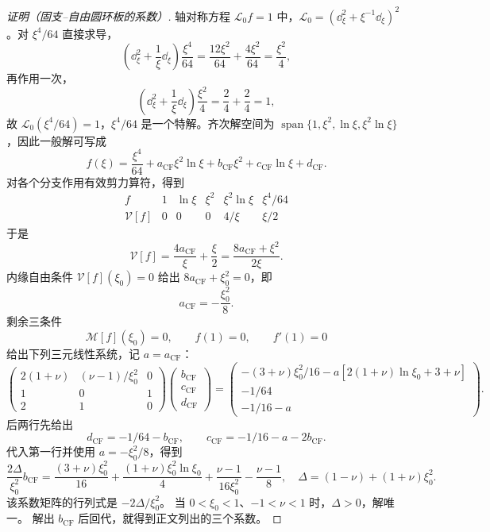 \begin{proof}[证明（固支--自由圆环板的系数）]
轴对称方程 \(\mathcal L_0 f=1\) 中，\(\mathcal L_0=(\dd_\xi^2+\xi^{-1}\dd_\xi)^2\)。对 \(\xi^4/64\) 直接求导，
\[
 \left(\dd_\xi^2+\frac1\xi\dd_\xi\right)\frac{\xi^4}{64}
 =\frac{12\xi^2}{64}+\frac{4\xi^2}{64}
 =\frac{\xi^2}{4},
\]
再作用一次，
\[
 \left(\dd_\xi^2+\frac1\xi\dd_\xi\right)\frac{\xi^2}{4}
 =\frac{2}{4}+\frac{2}{4}
 =1,
\]
故 \(\mathcal L_0(\xi^4/64)=1\)，\(\xi^4/64\) 是一个特解。齐次解空间为 \(\operatorname{span}\{1,\xi^2,\ln\xi,\xi^2\ln\xi\}\)，因此一般解可写成
\[
 f(\xi)=\frac{\xi^4}{64}
 +a_{\mathrm{CF}}\xi^2\ln\xi
 +b_{\mathrm{CF}}\xi^2+c_{\mathrm{CF}}\ln\xi+d_{\mathrm{CF}}.
\]
对各个分支作用有效剪力算符，得到
\[
\begin{array}{c|ccccc}
f&1&\ln\xi&\xi^2&\xi^2\ln\xi&\xi^4/64\\\hline
\mathcal V[f]&0&0&0&4/\xi&\xi/2
\end{array}
\]
于是
\[
\mathcal V[f]=\frac{4a_{\mathrm{CF}}}{\xi}+\frac\xi2
=\frac{8a_{\mathrm{CF}}+\xi^2}{2\xi}.
\]
内缘自由条件 \(\mathcal V[f](\xi_0)=0\) 给出 \(8a_{\mathrm{CF}}+\xi_0^2=0\)，即
\[
 a_{\mathrm{CF}}=-\frac{\xi_0^2}{8}.
\]
剩余三条件
\[
 \mathcal M[f](\xi_0)=0,
 \qquad f(1)=0,
 \qquad f'(1)=0
\]
给出下列三元线性系统，记 $a=a_{\mathrm{CF}}$：
\[
\begin{pmatrix}
2(1+\nu)&(\nu-1)/\xi_0^2&0\\
1&0&1\\
2&1&0
\end{pmatrix}
\begin{pmatrix}b_{\mathrm{CF}}\\c_{\mathrm{CF}}\\d_{\mathrm{CF}}\end{pmatrix}
=\begin{pmatrix}
-(3+\nu)\xi_0^2/16-a[2(1+\nu)\ln\xi_0+3+\nu]\\
-1/64\\-1/16-a
\end{pmatrix}.
\]
后两行先给出
\[
d_{\mathrm{CF}}=-1/64-b_{\mathrm{CF}},\qquad
c_{\mathrm{CF}}=-1/16-a-2b_{\mathrm{CF}}.
\]
代入第一行并使用 $a=-\xi_0^2/8$，得到
\[
\frac{2\Delta}{\xi_0^2}b_{\mathrm{CF}}
=\frac{(3+\nu)\xi_0^2}{16}
+\frac{(1+\nu)\xi_0^2\ln\xi_0}{4}
+\frac{\nu-1}{16\xi_0^2}-\frac{\nu-1}{8},
\quad\Delta=(1-\nu)+(1+\nu)\xi_0^2.
\]
该系数矩阵的行列式是 $-2\Delta/\xi_0^2$。
当 $0<\xi_0<1$、$-1<\nu<1$ 时，$\Delta>0$，解唯一。
解出 $b_{\mathrm{CF}}$ 后回代，就得到正文列出的三个系数。
\end{proof}
